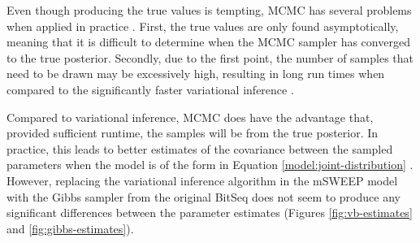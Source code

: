 \documentclass[officiallayout]{tktla}
\begin{document}
Even though producing the true values is tempting, MCMC has several
problems when applied in practice \citep{blei2017variational}. First,
the true values are only found asymptotically, meaning that it is
difficult to determine when the MCMC sampler has converged to the true
posterior. Secondly, due to the first point, the number of samples
that need to be drawn may be excessively high, resulting in long run
times when compared to the significantly faster variational inference
\citep{blei2017variational}.

Compared to variational inference, MCMC does have the advantage that,
provided sufficient runtime, the samples will be from the true
posterior. In practice, this leads to better estimates of the
covariance between the sampled parameters when the model is of the
form in Equation \ref{model:joint-distribution}
\citep{hensman2015fast}. However, replacing the variational inference
algorithm in the mSWEEP model with the Gibbs sampler from the original
BitSeq \citep{glaus2012identifying} does not seem to produce any
significant differences between the parameter estimates (Figures
\ref{fig:vb-estimates} and \ref{fig:gibbs-estimates}).
\end{document}
